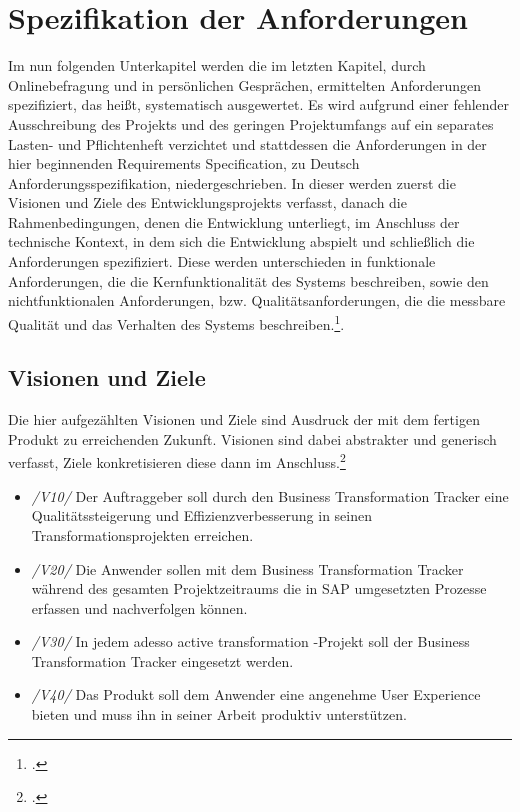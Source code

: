 \section{Spezifikation der Anforderungen}
Im nun folgenden Unterkapitel werden die im letzten Kapitel, durch Onlinebefragung und in persönlichen Gesprächen, ermittelten Anforderungen spezifiziert, das heißt, systematisch ausgewertet. Es wird aufgrund einer fehlender Ausschreibung des Projekts und des geringen Projektumfangs auf ein separates Lasten- und Pflichtenheft verzichtet und stattdessen die Anforderungen in der hier beginnenden \glqq{}Requirements Specification\grqq{}, zu Deutsch \glqq{}Anforderungsspezifikation\grqq{}, niedergeschrieben. In dieser werden zuerst die Visionen und Ziele des Entwicklungsprojekts verfasst, danach die Rahmenbedingungen, denen die Entwicklung unterliegt, im Anschluss der technische Kontext, in dem sich die Entwicklung abspielt und schließlich die Anforderungen spezifiziert. Diese werden unterschieden in funktionale Anforderungen, die die Kernfunktionalität des Systems beschreiben, sowie den nichtfunktionalen Anforderungen, bzw. Qualitätsanforderungen, die die messbare Qualität und das Verhalten des Systems beschreiben.\footcite[Vgl.][S. 492 ff.]{balzert}. 

\subsection{Visionen und Ziele}
Die hier aufgezählten Visionen und Ziele sind Ausdruck der mit dem fertigen Produkt zu erreichenden Zukunft. Visionen sind dabei abstrakter und generisch verfasst, Ziele konkretisieren diese dann im Anschluss.\footcite[Vgl.][S. 457]{balzert}
\begin{itemize}
    \item[] \emph{/V10/} Der Auftraggeber soll durch den Business Transformation Tracker eine Qualitätssteigerung und Effizienzverbesserung in seinen Transformationsprojekten erreichen.
    \item[] \emph{/V20/} Die Anwender sollen mit dem Business Transformation Tracker während des gesamten Projektzeitraums die in SAP umgesetzten Prozesse erfassen und nachverfolgen können.
    \item[] \emph{/V30/} In jedem adesso active transformation -Projekt soll der Business Transformation Tracker eingesetzt werden.
    \item[] \emph{/V40/} Das Produkt soll dem Anwender eine angenehme User Experience bieten und muss ihn in seiner Arbeit produktiv unterstützen.\\
\end{itemize}

